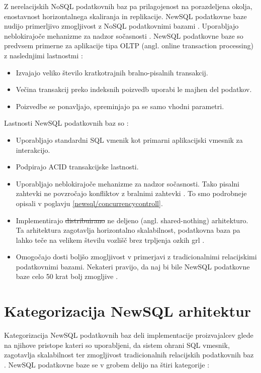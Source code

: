 \documentclass[a4paper, 12pt]{book}
\providecommand{\DIFaddtex}[1]{{\protect\color{blue}\uwave{#1}}} %
\providecommand{\DIFdeltex}[1]{{\protect\color{red}\sout{#1}}}                      %
\providecommand{\DIFaddbegin}{} %
\providecommand{\DIFaddend}{} %
\providecommand{\DIFdelbegin}{} %
\providecommand{\DIFdelend}{} %
\providecommand{\DIFadd}[1]{\texorpdfstring{\DIFaddtex{#1}}{#1}} %
\providecommand{\DIFdel}[1]{\texorpdfstring{\DIFdeltex{#1}}{}} %
\newcommand{\DIFscaledelfig}{0.5}
\newlength{\DIFdelgraphicswidth} %
\newlength{\DIFdelgraphicsheight} %
\newcommand{\DIFaddincludegraphics}[2][]{{\color{blue}\fbox{\DIFOincludegraphics[#1]{#2}}}} %
\newcommand{\DIFdelincludegraphics}[2][]{%
\sbox{\DIFdelgraphicsbox}{\DIFOincludegraphics[#1]{#2}}%
\settoboxwidth{\DIFdelgraphicswidth}{\DIFdelgraphicsbox} %
\settoboxtotalheight{\DIFdelgraphicsheight}{\DIFdelgraphicsbox} %
\scalebox{\DIFscaledelfig}{%
\parbox[b]{\DIFdelgraphicswidth}{\usebox{\DIFdelgraphicsbox}\\[-\baselineskip] \rule{\DIFdelgraphicswidth}{0em}}\llap{\resizebox{\DIFdelgraphicswidth}{\DIFdelgraphicsheight}{%
\setlength{\unitlength}{\DIFdelgraphicswidth}%
\begin{picture}(1,1)%
\thicklines\linethickness{2pt} %
{\color[rgb]{1,0,0}\put(0,0){\framebox(1,1){}}}%
{\color[rgb]{1,0,0}\put(0,0){\line( 1,1){1}}}%
{\color[rgb]{1,0,0}\put(0,1){\line(1,-1){1}}}%
\end{picture}%
}\hspace*{3pt}}} %
} %
\DeclareRobustCommand{\DIFaddbegin}{\DIFOaddbegin \let\includegraphics\DIFaddincludegraphics} %
\DeclareRobustCommand{\DIFaddend}{\DIFOaddend \let\includegraphics\DIFOincludegraphics} %
\DeclareRobustCommand{\DIFdelbegin}{\DIFOdelbegin \let\includegraphics\DIFdelincludegraphics} %
\DeclareRobustCommand{\DIFdelend}{\DIFOaddend \let\includegraphics\DIFOincludegraphics} %
\begin{document}
\noindent \DIFaddend Z nerelacijskih NoSQL podatkovnih baz pa prilagojenost na porazdeljena okolja, enostavnost horizontalnega skaliranja in replikacije. NewSQL podatkovne baze nudijo primerljivo zmogljivost z NoSQL podatkovnimi bazami \cite{oliveira2017newsql}. Uporabljajo neblokirajoče mehanizme za nadzor sočasnosti \cite{NewSQLNewWayToHandleBigData}. NewSQL podatkovne baze so predvsem primerne za aplikacije tipa OLTP (angl. online transaction processing) z naslednjimi lastnostmi \cite{Pavlo2016Sep}:
\begin{itemize}
    \item Izvajajo veliko število kratkotrajnih bralno-pisalnih transakcij.
    \item Večina transakcij preko indeksnih poizvedb uporabi le majhen del podatkov.
    \item Poizvedbe se ponavljajo, spreminjajo pa se samo \DIFaddbegin \DIFadd{njihovi }\DIFaddend vhodni parametri.
\end{itemize}

\noindent Lastnosti NewSQL podatkovnih baz so \DIFaddbegin \DIFadd{\mbox{%
\cite{Kumar2018Jun}}\hspace{0pt}%
}\DIFaddend :
\begin{itemize}
    \item Uporabljajo standardni SQL vmenik kot primarni aplikacijski vmesnik za interakcijo.
    \item Podpirajo ACID transakcijske lastnosti.
    \item Uporabljajo neblokirajoče mehanizme za nadzor sočasnosti. Tako pisalni zahtevki ne povzročajo konfliktov z bralnimi zahtevki \cite{NewSQLNewWayToHandleBigData}. To smo podrobneje opisali v poglavju \ref{newsql/concurrencycontroll}.
    \item Implementirajo \DIFdelbegin \DIFdel{distribuirano }\DIFdelend \DIFaddbegin \DIFadd{porazdeljeno }\DIFaddend ne deljeno (angl. shared-nothing) arhitekturo. Ta arhitektura zagotavlja horizontalno skalabilnost, podatkovna baza pa lahko teče na velikem številu vozlišč brez trpljenja ozkih grl \cite{NewSQLNewWayToHandleBigData}.
    \item Omogočajo dosti boljšo zmogljivost v primerjavi z tradicionalnimi relacijskimi podatkovnimi bazami. Nekateri pravijo, da naj bi bile NewSQL podatkovne baze celo 50 krat bolj zmogljive \cite{Kumar2018Jun}.
\end{itemize}

\section{Kategorizacija NewSQL arhitektur}
Kategorizacija NewSQL podatkovnih baz deli implementacije proizvajalcev glede na njihove pristope kateri so uporabljeni, da sistem ohrani SQL vmesnik, zagotavlja skalabilnost ter zmogljivost tradicionalnih relacijskih podatkovnih baz \cite{NewSQLNewWayToHandleBigData}. NewSQL podatkovne baze se v grobem delijo na štiri kategorije \cite{Mikuletic2015Feb, Pavlo2016Sep}:
\end{document}
